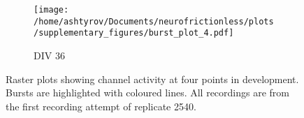 \documentclass[10pt]{article}
\begin{document}
\begin{figure}[h!]
\ContinuedFloat
\begin{subfigure}{\textwidth}
	\centering
	\texttt{[image: /home/ashtyrov/Documents/neurofrictionless/plots/supplementary\_figures/burst\_plot\_4.pdf]}
	\caption{DIV 36}
\end{subfigure}
\caption{Raster plots showing channel activity at four points in development. Bursts are highlighted with coloured lines. All recordings are from the first recording attempt of replicate 2540.}
\label{fig:rasters}
\end{figure}
\end{document}

